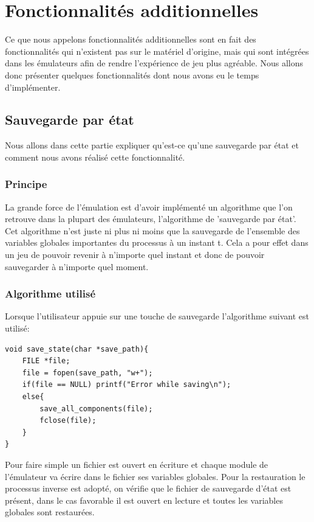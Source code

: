 \documentclass{report}
\begin{document}
\section{Fonctionnalités additionnelles}
Ce que nous appelons fonctionnalités additionnelles sont en fait des fonctionnalités qui n'existent pas sur le matériel d'origine, mais qui sont intégrées dans les émulateurs afin de rendre l'expérience de jeu plus agréable. Nous allons donc présenter quelques fonctionnalités dont nous avons eu le temps d'implémenter.
\subsection{Sauvegarde par état}
Nous allons dans cette partie expliquer qu'est-ce qu'une sauvegarde par état et comment nous avons réalisé cette fonctionnalité.
\subsubsection{Principe}
La grande force de l'émulation est d'avoir implémenté un algorithme que l'on retrouve dans la plupart des émulateurs, l'algorithme de 'sauvegarde par état'. Cet algorithme n'est juste ni plus ni moins que la sauvegarde de l'ensemble des variables globales importantes du processus à un instant t. Cela a pour effet dans un jeu de pouvoir revenir à n'importe quel instant et donc de pouvoir sauvegarder à n'importe quel moment.
\subsubsection{Algorithme utilisé}
Lorsque l'utilisateur appuie sur une touche de sauvegarde l'algorithme suivant est utilisé:
\begin{lstlisting}
void save_state(char *save_path){
	FILE *file;
	file = fopen(save_path, "w+");
	if(file == NULL) printf("Error while saving\n");
	else{
		save_all_components(file);
		fclose(file);
	}
}
\end{lstlisting}
Pour faire simple un fichier est ouvert en écriture et chaque module de l'émulateur va écrire dans le fichier ses variables globales.
Pour la restauration le processus inverse est adopté, on vérifie que le fichier de sauvegarde d'état est présent, dans le cas favorable il est ouvert en lecture et toutes les variables globales sont restaurées.
\end{document}
